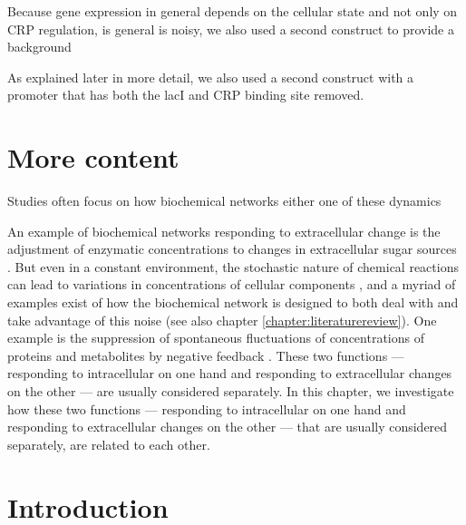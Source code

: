 Because gene expression in general depends on the cellular state and not only on CRP regulation, 
is general is noisy, we also used a second construct to provide a background 


%
As explained later in more detail, we also used a second construct with a promoter that has both the lacI and CRP binding site removed. 
%

























\section{More content}




Studies often focus on how biochemical networks either one of these dynamics

An example of biochemical networks responding to extracellular change is the adjustment of enzymatic concentrations to changes in extracellular sugar sources \cite{Towbin2017}.
But even in a constant environment, the stochastic nature of chemical reactions can lead to variations in concentrations of cellular components  \cite{Elowitz2002,Kiviet2014}, 
and a myriad of examples exist of how the biochemical network is designed to both deal with and take advantage of this noise (see also chapter \ref{chapter:literaturereview}).
One example is the suppression of spontaneous fluctuations of concentrations of proteins and metabolites by negative feedback \cite{Brandman2008, Lestas2010, Bowsher2013}.
These two functions --- responding to intracellular on one hand and responding to extracellular changes on the other --- are usually considered separately.
In this chapter, we investigate how these two functions --- responding to intracellular on one hand and responding to extracellular changes on the other --- that are usually considered separately, are related to each other.



\section{Introduction}

